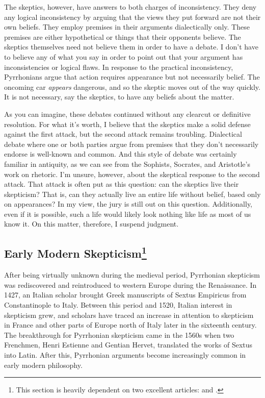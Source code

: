 The skeptics, however, have answers to both charges of inconsistency. They deny any logical inconsistency by arguing that the views they put forward are not their own beliefs. They employ premises in their arguments dialectically only. These premises are either hypothetical or things that their opponents believe. The skeptics themselves need not believe them in order to have a debate. I don't have to believe any of what you say in order to point out that your argument has inconsistencies or logical flaws. In response to the practical inconsistency, Pyrrhonians argue that action requires appearance but not necessarily belief. The oncoming car \textit{appears} dangerous, and so the skeptic moves out of the way quickly. It is not necessary, say the skeptics, to have any beliefs about the matter.

As you can imagine, these debates continued without any clearcut or definitive resolution. For what it's worth, I believe that the skeptics make a solid defense against the first attack, but the second attack remains troubling. Dialectical debate where one or both parties argue from premises that they don't necessarily endorse is well-known and common. And this style of debate was certainly familiar in antiquity, as we can see from the Sophists, Socrates, and Aristotle's work on rhetoric. I'm unsure, however, about the skeptical response to the second attack. That attack is often put as this question: can the skeptics live their skepticism? That is, can they actually live an entire life without belief, based only on appearances? In my view, the jury is still out on this question. Additionally, even if it is possible, such a life would likely look nothing like life as most of us know it. On this matter, therefore, I suspend judgment.

\subsection*{Early Modern Skepticism\footnote{This section is heavily dependent on two excellent articles: \citet{schmitt1983} and \citet{popkin1993}.}}

After being virtually unknown during the medieval period, Pyrrhonian skepticism was rediscovered and reintroduced to western Europe during the Renaissance. In 1427, an Italian scholar brought Greek manuscripts of Sextus Empiricus from Constantinople to Italy. Between this period and 1520, Italian interest in skepticism grew, and scholars have traced an increase in attention to skepticism in France and other parts of Europe north of Italy later in the sixteenth century. The breakthrough for Pyrrhonian skepticism came in the 1560s when two Frenchmen, Henri Estienne  and Gentian Hervet, translated the works of Sextus into Latin. After this, Pyrrhonian arguments become increasingly common in early modern philosophy.

